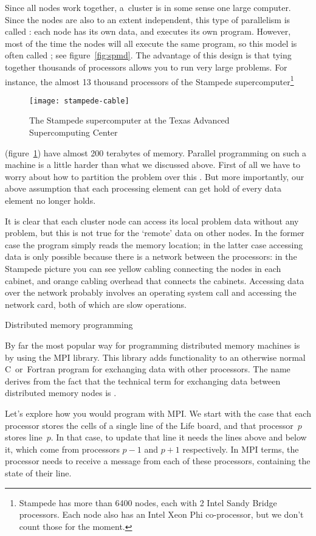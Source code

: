 Since all nodes work together, a~cluster is in some sense one
large computer. 
Since the nodes are also to an extent independent, this type of parallelism is
called : each node has its own data, and executes its own program.
However, most of the time the nodes will all execute
the same program, so this model is often called ; see figure~\ref{fig:spmd}.
The advantage of this design is that tying
together thousands of processors allows you to run very large problems.
For instance, the almost 13 thousand processors of the Stampede supercomputer\footnote
{Stampede has more than 6400 nodes, each with 2 Intel Sandy Bridge processors.
Each node also has an Intel Xeon Phi co-processor, but we don't count those for the moment.}
\begin{figure}[t]
  \texttt{[image: stampede-cable]}
  \caption{The Stampede supercomputer at the Texas Advanced Supercomputing Center}
  \label{fig:stampede}
\end{figure}
(figure~\ref{fig:stampede}) have almost 200 terabytes of memory.
Parallel programming on such a machine is a little harder
than what we discussed above.
First of all we have to worry about
how to partition the problem over this .
But more importantly, our above assumption that each processing element
can get hold of every data element no longer holds.

It is clear that each cluster node can access its local
problem data without any problem, but this is not true for the `remote' data
on other nodes.
In the former case the program simply reads the memory location;
in the latter case accessing data is only possible because there is a network
between the processors: in the Stampede picture you can see yellow cabling
connecting the nodes in each cabinet, and orange cabling overhead that connects the cabinets.
Accessing data over the network
probably involves an operating system call and accessing
the network card, both of which are slow operations.

 {Distributed memory programming}
\label{sec:mpi}

By far the most popular way for programming distributed memory
machines is by using the \acf{MPI} library. This library adds
functionality to an otherwise normal C~or~Fortran program for
exchanging data with other processors. The name derives
from the fact that the technical term for
exchanging data between distributed memory nodes
is .

Let's explore how you would program with MPI.
We start with the case that each processor stores the cells
of a single line of the Life board, and that processor~$p$ stores line~$p$.
In that case, to update that line
it needs the lines above and below it, which come from processors $p-1$ and $p+1$
respectively. In MPI terms, the processor needs to receive a message
from each of these processors, containing the state of their line.


